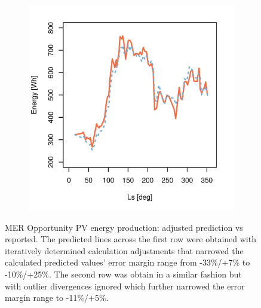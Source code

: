 \begin{figure}[h]
\begin{subfigure}[t]{\subfigureWidth}
		\label{fig:plot:sub:mer-energy-production-predicted-vs-reported-my30-adjusted-without-outliers}
	\end{subfigure}\hfill
    \begin{subfigure}[t]{\subfigureWidth}
        \centering
		\includegraphics[height=\graphicsHeight]{sections/appendix/B/plots/predicted-vs-measured-energy-my32-adjusted-without-outliers.png}
		\label{fig:plot:sub:mer-energy-production-predicted-vs-reported-my32-adjusted-without-outliers}
	\end{subfigure}
    \caption[MER Opportunity PV energy production: adjusted prediction vs reported]
            {MER Opportunity PV energy production: adjusted prediction vs reported. The predicted lines across the first row were obtained with iteratively determined calculation adjustments that narrowed the calculated predicted values' error margin range from -33\%/+7\% to -10\%/+25\%. The second row was obtain in a similar fashion but with outlier divergences ignored which further narrowed the error margin range to -11\%/+5\%.}
    \label{fig:plot:mer-energy-production-predicted-vs-reported-adjusted-with-and-without-outliers}
\vspace{-2ex}
\end{figure}
